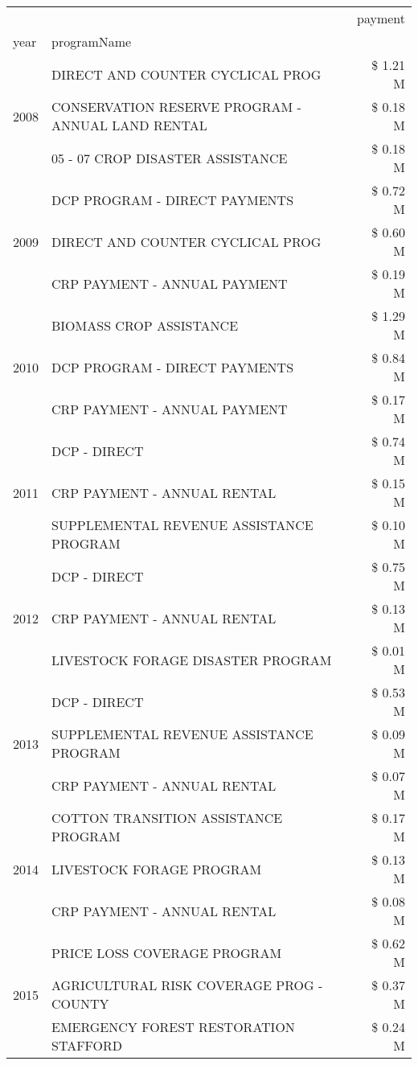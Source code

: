 \begin{tabular}{llr}
\toprule
 &  & payment \\
year & programName &  \\
\midrule
\multirow[t]{3}{*}{2008} & DIRECT AND COUNTER CYCLICAL PROG & \$ 1.21 M \\
 & CONSERVATION RESERVE PROGRAM - ANNUAL LAND RENTAL & \$ 0.18 M \\
 & 05 - 07 CROP DISASTER ASSISTANCE & \$ 0.18 M \\
\cline{1-3}
\multirow[t]{3}{*}{2009} & DCP PROGRAM - DIRECT PAYMENTS & \$ 0.72 M \\
 & DIRECT AND COUNTER CYCLICAL PROG & \$ 0.60 M \\
 & CRP PAYMENT - ANNUAL PAYMENT & \$ 0.19 M \\
\cline{1-3}
\multirow[t]{3}{*}{2010} & BIOMASS CROP ASSISTANCE & \$ 1.29 M \\
 & DCP PROGRAM - DIRECT PAYMENTS & \$ 0.84 M \\
 & CRP PAYMENT - ANNUAL PAYMENT & \$ 0.17 M \\
\cline{1-3}
\multirow[t]{3}{*}{2011} & DCP - DIRECT & \$ 0.74 M \\
 & CRP PAYMENT - ANNUAL RENTAL & \$ 0.15 M \\
 & SUPPLEMENTAL REVENUE ASSISTANCE PROGRAM & \$ 0.10 M \\
\cline{1-3}
\multirow[t]{3}{*}{2012} & DCP - DIRECT & \$ 0.75 M \\
 & CRP PAYMENT - ANNUAL RENTAL & \$ 0.13 M \\
 & LIVESTOCK FORAGE DISASTER PROGRAM & \$ 0.01 M \\
\cline{1-3}
\multirow[t]{3}{*}{2013} & DCP - DIRECT & \$ 0.53 M \\
 & SUPPLEMENTAL REVENUE ASSISTANCE PROGRAM & \$ 0.09 M \\
 & CRP PAYMENT - ANNUAL RENTAL & \$ 0.07 M \\
\cline{1-3}
\multirow[t]{3}{*}{2014} & COTTON TRANSITION ASSISTANCE PROGRAM & \$ 0.17 M \\
 & LIVESTOCK FORAGE PROGRAM & \$ 0.13 M \\
 & CRP PAYMENT - ANNUAL RENTAL & \$ 0.08 M \\
\cline{1-3}
\multirow[t]{3}{*}{2015} & PRICE LOSS COVERAGE PROGRAM & \$ 0.62 M \\
 & AGRICULTURAL RISK COVERAGE PROG - COUNTY & \$ 0.37 M \\
 & EMERGENCY FOREST RESTORATION STAFFORD & \$ 0.24 M \\
\cline{1-3}

\end{tabular}
